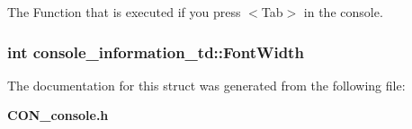 The Function that is executed if you press $<$Tab$>$ in the console.

\subsubsection{\setlength{\rightskip}{0pt plus 5cm}int console\_\-information\_\-td::Font\-Width}\label{structconsole__information__td_m31}




The documentation for this struct was generated from the following file:\begin{CompactItemize}
\item 
{\bf CON\_\-console.h}\end{CompactItemize}
